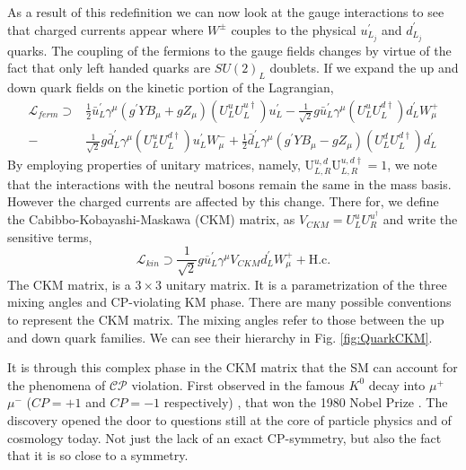 As a result of this redefinition we can now look at the gauge interactions to see that charged currents appear where $W^\pm$ couples to the physical $u^\prime_{L_j}$ and $d^\prime_{L_j}$ quarks. 
%
The coupling of the fermions to the gauge fields changes by virtue of the fact that only left handed quarks are $SU(2)_L$ doublets. If we expand the up and down quark fields on the kinetic portion of the Lagrangian,
%
\begin{equation}
\label{LagFermFCCCs}
\begin{split}
\mathcal{L}_{ferm} \supset & 
\frac{1}{2} \bar{u}^\prime_L \gamma^\mu \left( g^\prime Y B_\mu + g Z_\mu  \right) \left(U^u_L U^{u \dagger}_L \right) u^\prime_L - \frac{1}{\sqrt{2}} g \bar{u}^\prime_L \gamma^\mu \left( U^u_L U^{d \dagger}_L \right) d^\prime_L W^+_\mu \\ \nonumber   
- 
& \frac{1}{\sqrt{2}} g \bar{d}^\prime_L \gamma^\mu \left( U^u_L U^{d \dagger}_L \right) u^\prime_L W^-_\mu 
+ 
\frac{1}{2} \bar{d}^\prime_L \gamma^\mu \left( g^\prime Y B_\mu - g Z_\mu \right) \left( U^d_L U^{d \dagger}_L \right) d^\prime_L  
\end{split}
\end{equation}
%
By employing properties of unitary matrices, namely, $ \mathrm{U}^{u,d}_{L,R} \mathrm{U}^{u,d \dagger}_{L,R} = 1$, we note that the interactions with the neutral bosons remain the same in the mass basis.
%
However the charged currents are affected by this change.
%
There for, we define the Cabibbo-Kobayashi-Maskawa (CKM) matrix, as $V_{CKM} = U^u_L U^{u ^\dagger }_R $ and write the sensitive terms,
%
\begin{equation}
\mathcal{L}_{kin} \supset \frac{1}{\sqrt{2}} g \overline{u}^\prime_L \gamma^\mu V_{CKM} d_L^\prime W^+_\mu + \text{H.c.} 
\end{equation}
%
The CKM matrix, is a $3 \times 3$ unitary matrix. It is a parametrization of the three mixing angles and CP-violating KM phase. There are many possible conventions to represent the CKM matrix.
%
The mixing angles refer to those between the up and down quark families. We can see their hierarchy in Fig. \ref{fig:QuarkCKM}.

It is through this complex phase in the CKM matrix that the SM can account for the phenomena of $\mathcal{CP}$ violation. First observed in the famous $K^0$ decay into $\mu^+$ $\mu^-$ ($CP=+1$ and $CP=-1$ respectively) \cite{PhysRevLett.13.138}, that won the 1980 Nobel Prize \cite{NobelPrize:1980-Physics}. The discovery opened the door to questions still at the core of particle physics and of cosmology today. Not just the lack of an exact CP-symmetry, but also the fact that it is so close to a symmetry.

